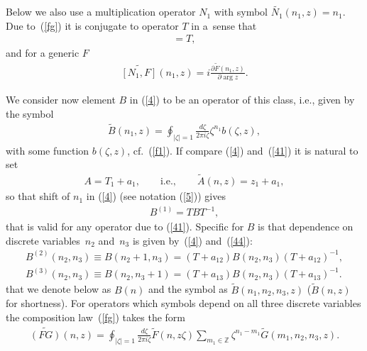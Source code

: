 \documentclass[pdftex]{sigma}
\numberwithin{equation}{section}
\begin{document}
Below we also use a multiplication operator $N_{1}$ with symbol $\widetilde{N_1}(n_1,z)=n_1$. Due to~(\ref{fg}) it is conjugate to operator $T$ in a~sense that
\begin{gather}
 [T,N_1]=T,\label{fg1}
\end{gather}
and for a generic $F$
\begin{gather}
 \widetilde{[N_1,F]}(n_1,z)=i\frac{\partial\widetilde{F}(n_1,z)}{\partial\arg{z}}.\label{fg2}
\end{gather}

We consider now element $B$ in (\ref{4}) to be an operator of this class, i.e., given by the symbol
\begin{gather}
\widetilde{B}(n_1,z)=\oint_{|\zeta|=1}\frac{d\zeta}{2\pi i\zeta}\zeta^{n_1}b(\zeta,z),\label{f2}
\end{gather}
with some function $b(\zeta,z)$, cf.~(\ref{f1}). If compare (\ref{4}) and~(\ref{41}) it is natural to set
\begin{gather}
 A=T_1+a_1,\qquad\text{i.e.},\qquad \widetilde{A}(n,z)=z_1+a_1,\label{44}
\end{gather}
so that shift of $n_1$ in (\ref{4}) (see notation (\ref{5})) gives
\begin{gather}
B^{(1)}=TBT^{-1},\label{n8}
\end{gather}
that is valid for any operator due to (\ref{41}). Specif\/ic for $B$ is that dependence on discrete variables~$n_2$ and~$n_3$ is given by~(\ref{4}) and~(\ref{44}):
\begin{gather}
B^{(2)}(n_2,n_3)\equiv B(n_2+1,n_3) =(T+a_{12})B(n_2,n_3)(T+a_{12})^{-1},\label{n9}\\
B^{(3)}(n_2,n_3)\equiv B(n_2,n_3+1)=(T+a_{13})B(n_2,n_3)(T+a_{13})^{-1}.\label{n10}
\end{gather}
that we denote below as $B(n)$ and the symbol as $\widetilde{B}(n_1,n_2,n_3,z)$ ($\widetilde{B}(n,z)$ for shortness). For operators which symbols depend on all three discrete variables the composition law~(\ref{fg}) takes the form
\begin{gather}
\widetilde{(FG)}(n,z)=\oint_{|\zeta|=1}\frac{d\zeta}{2\pi i\zeta}\widetilde{F}(n,z\zeta) \sum_{m_1\in\mathbb{Z}}\zeta^{n_1-m_1}\widetilde{G}(m_1,n_2,n_3,z).\label{33}
\end{gather}
\end{document}
